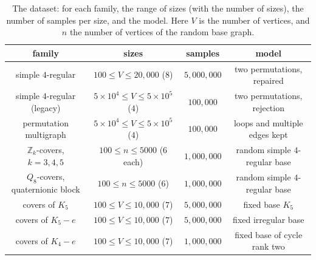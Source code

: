 \documentclass[12pt,oneside,english]{amsart}
\numberwithin{equation}{section}
\numberwithin{figure}{section}
\numberwithin{table}{section}
\theoremstyle{plain}
\numberwithin{thm}{section}
\theoremstyle{plain}
\theoremstyle{plain}
\theoremstyle{plain}
\theoremstyle{definition}
\theoremstyle{definition}
\theoremstyle{definition}
\theoremstyle{remark}
\providecommand{\tabularnewline}{\\}
\begin{document}
\begin{table}[tbp]
\begin{centering}
{\footnotesize\setlength{\tabcolsep}{3pt}
\begin{tabular}{|c|c|c|c|}
\hline
family & sizes & samples & model\tabularnewline
\hline
simple $4$-regular & $100\leq V\leq20{,}000$ ($8$) & $5{,}000{,}000$ & two permutations, repaired\tabularnewline
\hline
simple $4$-regular (legacy) & $5\times10^{4}\leq V\leq5\times10^{5}$ ($4$) & $100{,}000$ & two permutations, rejection\tabularnewline
\hline
permutation multigraph & $5\times10^{4}\leq V\leq5\times10^{5}$ ($4$) & $100{,}000$ & loops and multiple edges kept\tabularnewline
\hline
$\mathbb{Z}_{k}$-covers, $k=3,4,5$ & $100\leq n\leq5000$ ($6$ each) & $1{,}000{,}000$ & random simple $4$-regular base\tabularnewline
\hline
$Q_{8}$-covers, quaternionic block & $100\leq n\leq5000$ ($6$) & $1{,}000{,}000$ & random simple $4$-regular base\tabularnewline
\hline
covers of $K_{5}$ & $100\leq V\leq10{,}000$ ($7$) & $5{,}000{,}000$ & fixed base $K_{5}$\tabularnewline
\hline
covers of $K_{5}-e$ & $100\leq V\leq10{,}000$ ($7$) & $5{,}000{,}000$ & fixed irregular base\tabularnewline
\hline
covers of $K_{4}-e$ & $100\leq V\leq10{,}000$ ($7$) & $1{,}000{,}000$ & fixed base of cycle rank two\tabularnewline
\hline
\end{tabular}}
\par\end{centering}
\caption{\label{tab:dataset}The dataset: for each family, the range of sizes
(with the number of sizes), the number of samples per size, and the
model. Here $V$ is the number of vertices, and $n$ the number of
vertices of the random base graph.}
\end{table}
\end{document}
